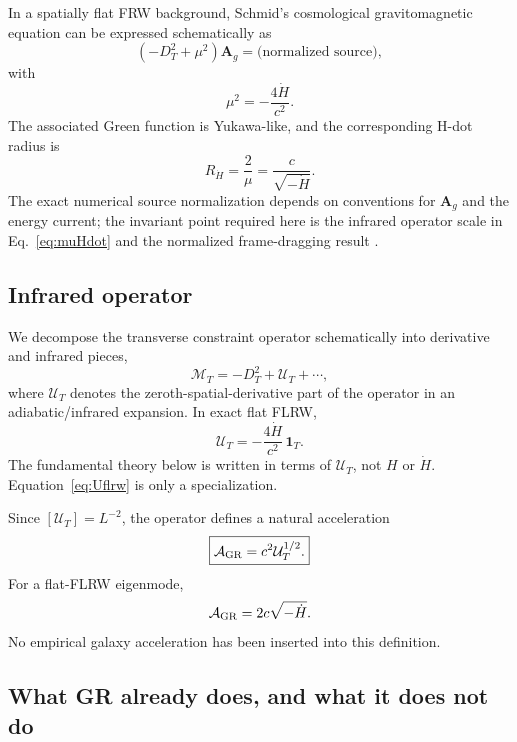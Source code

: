 \documentclass[11pt]{article}
\newcommand{\MT}{\mathcal{M}_{T}}
\newcommand{\UT}{\mathcal{U}_{T}}
\begin{document}
In a spatially flat FRW background, Schmid's cosmological gravitomagnetic equation can be expressed schematically as
\begin{equation}
    \left(-D_T^2+\mu^2\right)\bm{A}_g
    = \text{(normalized source)},
\end{equation}
with
\begin{equation}
    \mu^2=-\frac{4\dot H}{c^2}.
    \label{eq:muHdot}
\end{equation}
The associated Green function is Yukawa-like, and the corresponding H-dot radius is
\begin{equation}
    R_{\dot H}=\frac{2}{\mu}=\frac{c}{\sqrt{-\dot H}}.
\end{equation}
The exact numerical source normalization depends on conventions for $\bm A_g$ and the energy current; the invariant point required here is the infrared operator scale in Eq.~\eqref{eq:muHdot} and the normalized frame-dragging result \cite{Schmid2008a,Schmid2008b}.

\subsection{Infrared operator}

We decompose the transverse constraint operator schematically into derivative and infrared pieces,
\begin{equation}
    \MT = -D_T^2 + \UT + \cdots,
    \label{eq:operatorSplit}
\end{equation}
where $\UT$ denotes the zeroth-spatial-derivative part of the operator in an adiabatic/infrared expansion. In exact flat FLRW,
\begin{equation}
    \boxed{\UT=-\frac{4\dot H}{c^2}\,\mathbf{1}_T.}
    \label{eq:Uflrw}
\end{equation}
The fundamental theory below is written in terms of $\UT$, not $H$ or $\dot H$. Equation~\eqref{eq:Uflrw} is only a specialization.

Since $[\UT]=L^{-2}$, the operator defines a natural acceleration
\begin{equation}
    \boxed{\mathcal A_{\rm GR}=c^2\UT^{1/2}.}
    \label{eq:Agr}
\end{equation}
For a flat-FLRW eigenmode,
\begin{equation}
    \mathcal A_{\rm GR}=2c\sqrt{-\dot H}.
    \label{eq:AgrFLRW}
\end{equation}
No empirical galaxy acceleration has been inserted into this definition.

\subsection{What GR already does, and what it does not do}
\end{document}
